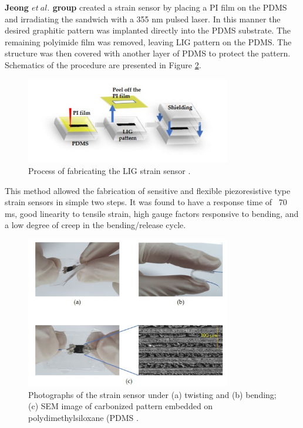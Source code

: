 \textbf{Jeong $et\:al.$ \cite{jeong_flexible_2019} group} created a strain sensor by placing a PI film on the PDMS and irradiating the sandwich with a 355 nm pulsed laser. In this manner the desired graphitic pattern was implanted directly into the PDMS substrate. The remaining polyimide film was removed, leaving LIG pattern on the PDMS. The structure was then covered with another layer of PDMS to protect the pattern. Schematics of the procedure are presented in Figure \ref{fig:strain_jeong}. 


\begin{figure}[H]
\centering
\includegraphics[width=0.8\textwidth]{Figures/Theory/Jeong.jpg}
\medskip
\captionsetup{width=0.8\linewidth}
\caption{Process of fabricating the LIG strain sensor \cite{jeong_flexible_2019}.}
\label{fig:strain_jeong}
\end{figure}

This method allowed the fabrication of sensitive and flexible piezoresistive type strain sensors in simple two steps. It was found to have a response time of ~70 ms, good linearity to tensile strain, high gauge factors responsive to bending, and a low degree of creep in the bending/release cycle. 

\begin{figure}[H]
\centering
\includegraphics[width=0.8\textwidth]{Figures/Theory/Jeong_2.jpg}
\medskip
\captionsetup{width=0.8\linewidth}
\caption{Photographs of the strain sensor under (a) twisting and (b) bending;  (c) SEM image of carbonized pattern embedded on polydimethylsiloxane (PDMS \cite{jeong_flexible_2019}.}
\label{fig:strain_jeong}
\end{figure}

